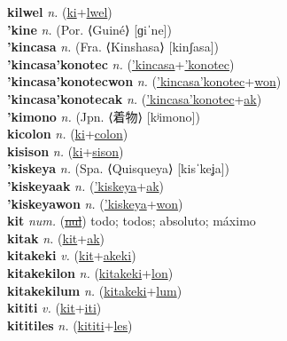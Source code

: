\textbf{kilwel} \textit{n.} (\hyperref[ki]{ki}+\hyperref[lwel]{lwel})
 \label{kilwel} \\
\textbf{'kine} \textit{n.} (Por. ⟨Guiné⟩ [ɡiˈne])
 \label{'kine} \\
\textbf{'kincasa} \textit{n.} (Fra. ⟨Kinshasa⟩ [kinʃasa])
 \label{'kincasa} \\
\textbf{'kincasa'konotec} \textit{n.} (\hyperref['kincasa]{'kincasa}+\hyperref['konotec]{'konotec})
 \label{'kincasa'konotec} \\
\textbf{'kincasa'konotecwon} \textit{n.} (\hyperref['kincasa'konotec]{'kincasa'konotec}+\hyperref[won]{won})
 \label{'kincasa'konotecwon} \\
\textbf{'kincasa'konotecak} \textit{n.} (\hyperref['kincasa'konotec]{'kincasa'konotec}+\hyperref[ak]{ak})
 \label{'kincasa'konotecak} \\
\textbf{'kimono} \textit{n.} (Jpn. ⟨着物⟩ [kʲimono])
 \label{'kimono} \\
\textbf{kicolon} \textit{n.} (\hyperref[ki]{ki}+\hyperref[colon]{colon})
 \label{kicolon} \\
\textbf{kisison} \textit{n.} (\hyperref[ki]{ki}+\hyperref[sison]{sison})
 \label{kisison} \\
\textbf{'kiskeya} \textit{n.} (Spa. ⟨Quisqueya⟩ [kisˈkeʝa])
 \label{'kiskeya} \\
\textbf{'kiskeyaak} \textit{n.} (\hyperref['kiskeya]{'kiskeya}+\hyperref[ak]{ak})
 \label{'kiskeyaak} \\
\textbf{'kiskeyawon} \textit{n.} (\hyperref['kiskeya]{'kiskeya}+\hyperref[won]{won})
 \label{'kiskeyawon} \\
\textbf{kit} \textit{num.} (\hyperref[nul]{\sout{nul}})
todo; todos; absoluto; máximo \label{kit} \\
\textbf{kitak} \textit{n.} (\hyperref[kit]{kit}+\hyperref[ak]{ak})
 \label{kitak} \\
\textbf{kitakeki} \textit{v.} (\hyperref[kit]{kit}+\hyperref[akeki]{akeki})
 \label{kitakeki} \\
\textbf{kitakekilon} \textit{n.} (\hyperref[kitakeki]{kitakeki}+\hyperref[lon]{lon})
 \label{kitakekilon} \\
\textbf{kitakekilum} \textit{n.} (\hyperref[kitakeki]{kitakeki}+\hyperref[lum]{lum})
 \label{kitakekilum} \\
\textbf{kititi} \textit{v.} (\hyperref[kit]{kit}+\hyperref[iti]{iti})
 \label{kititi} \\
\textbf{kititiles} \textit{n.} (\hyperref[kititi]{kititi}+\hyperref[les]{les})
 \label{kititiles} \\
